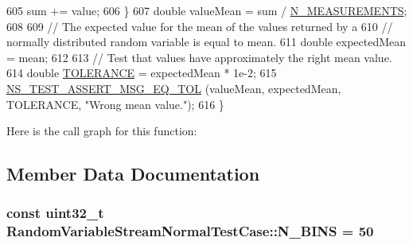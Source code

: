 \begin{DoxyCode}
605       sum += value;
606     \}
607   \textcolor{keywordtype}{double} valueMean = sum / \hyperlink{classRandomVariableStreamNormalTestCase_a8aa4e12111094e204d6019bb0c48b4cf}{N\_MEASUREMENTS};
608 
609   \textcolor{comment}{// The expected value for the mean of the values returned by a}
610   \textcolor{comment}{// normally distributed random variable is equal to mean.}
611   \textcolor{keywordtype}{double} expectedMean = mean;
612 
613   \textcolor{comment}{// Test that values have approximately the right mean value.}
614   \textcolor{keywordtype}{double} \hyperlink{spectrum-value-test_8cc_a30c17564229ec2e37dfea9c6c9ad643e}{TOLERANCE} = expectedMean * 1e-2;
615   \hyperlink{group__testing_ga9e7861b56b4e70db3b56044cb7a28e41}{NS\_TEST\_ASSERT\_MSG\_EQ\_TOL} (valueMean, expectedMean, TOLERANCE, \textcolor{stringliteral}{"Wrong mean
       value."}); 
616 \}
\end{DoxyCode}


Here is the call graph for this function\+:




\subsection{Member Data Documentation}
\subsubsection[{\texorpdfstring{N\+\_\+\+B\+I\+NS}{N_BINS}}]{\setlength{\rightskip}{0pt plus 5cm}const uint32\+\_\+t Random\+Variable\+Stream\+Normal\+Test\+Case\+::\+N\+\_\+\+B\+I\+NS = 50\hspace{0.3cm}{\ttfamily [static]}}\hypertarget{classRandomVariableStreamNormalTestCase_a0adaeedb952b593d21ebd9915597837d}{}\label{classRandomVariableStreamNormalTestCase_a0adaeedb952b593d21ebd9915597837d}
